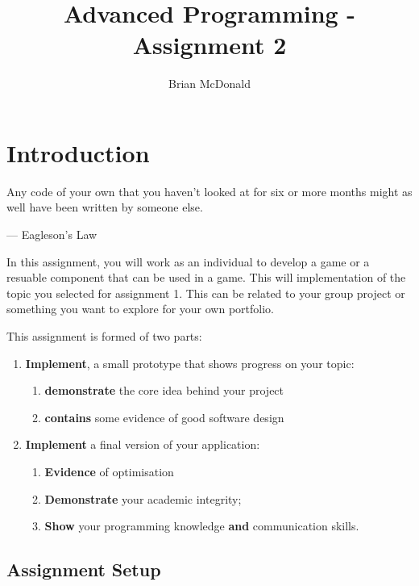 \documentclass{../../fal_assignment}
\title{Advanced Programming - Assignment 2}
\author{Brian McDonald}
\begin{document}
\maketitle

\section*{Introduction}

\begin{marginquote}
Any code of your own that you haven't looked at for six or more months might as well have been written by someone else.

--- Eagleson's Law

\end{marginquote}

In this assignment, you will work as an individual to develop a game or a resuable component that can be used in a game. This will implementation of the topic you selected for assignment 1. This can be related to your group project or something you want to explore for your own portfolio.

This assignment is formed of two parts:

\begin{enumerate}[label=(\Alph*)]
    \item \textbf{Implement}, a small prototype that shows progress on your topic:
    	\begin{enumerate}[label=\roman*.]
    		\item \textbf{demonstrate} the core idea behind your project
			\item \textbf{contains} some evidence of good software design
		\end{enumerate}
    \item \textbf{Implement} a final version of your application:
    	\begin{enumerate}[label=\roman*.]
    		\item \textbf{Evidence} of optimisation
    		\item \textbf{Demonstrate} your academic integrity;
    		\item \textbf{Show} your programming knowledge \textbf{and} communication skills.
		\end{enumerate}
\end{enumerate}

\subsection*{Assignment Setup}
\end{document}
